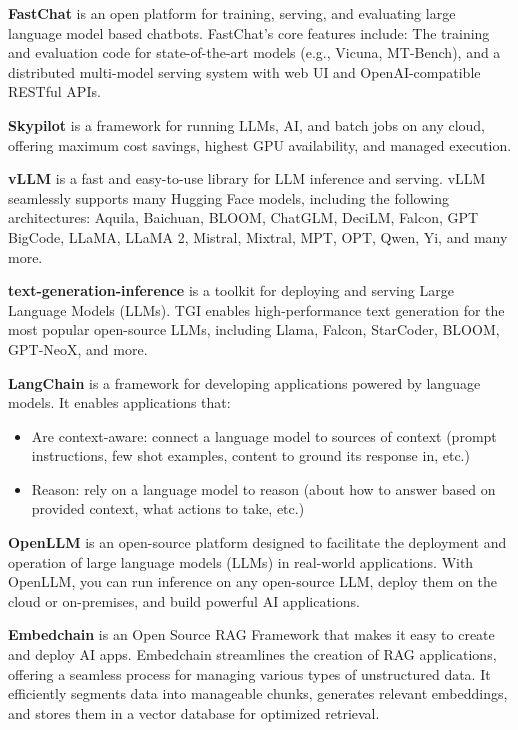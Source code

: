 \documentclass[conference]{IEEEtran}
\begin{document}
\textbf{FastChat} \cite{FastChat} is an open platform for training, serving, and evaluating large language model based chatbots. 
FastChat's core features include:
The training and evaluation code for state-of-the-art models (e.g., Vicuna, MT-Bench), and a distributed multi-model serving system with web UI and OpenAI-compatible RESTful APIs.

\textbf{Skypilot} \cite{skypilot} is a framework for running LLMs, AI, and batch jobs on any cloud, offering maximum cost savings, highest GPU availability, and managed execution.

\textbf{vLLM} \cite{vllm} is a fast and easy-to-use library for LLM inference and serving. 
vLLM seamlessly supports many Hugging Face models, including the following architectures: Aquila, Baichuan, BLOOM, ChatGLM, DeciLM, Falcon, GPT BigCode, LLaMA, LLaMA 2, Mistral, Mixtral, MPT, OPT, Qwen, Yi, and many more.

\textbf{text-generation-inference} \cite{text-generation-inference} is a toolkit for deploying and serving Large Language Models (LLMs). TGI enables high-performance text generation for the most popular open-source LLMs, including Llama, Falcon, StarCoder, BLOOM, GPT-NeoX, and more. 

\textbf{LangChain} \cite{langchain} is a framework for developing applications powered by language models. It enables applications that:
\begin{itemize}
    \item Are context-aware: connect a language model to sources of context (prompt instructions, few shot examples, content to ground its response in, etc.)
    \item Reason: rely on a language model to reason (about how to answer based on provided context, what actions to take, etc.)
\end{itemize}


\textbf{OpenLLM} \cite{OpenLLM} is an open-source platform designed to facilitate the deployment and operation of large language models (LLMs) in real-world applications. With OpenLLM, you can run inference on any open-source LLM, deploy them on the cloud or on-premises, and build powerful AI applications.

\textbf{Embedchain} \cite{embedchain} is an Open Source RAG Framework that makes it easy to create and deploy AI apps.
Embedchain streamlines the creation of RAG applications, offering a seamless process for managing various types of unstructured data. It efficiently segments data into manageable chunks, generates relevant embeddings, and stores them in a vector database for optimized retrieval.
\end{document}
